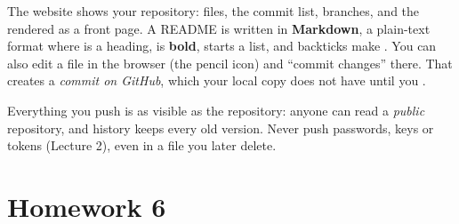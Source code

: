 The website shows your repository: files, the commit list, branches, and the  rendered as a front page. A README is written in \textbf{Markdown}, a plain-text format where  is a heading,  is \textbf{bold},  starts a list, and backticks make . You can also edit a file in the browser (the pencil icon) and ``commit changes'' there. That creates a \emph{commit on GitHub}, which your local copy does not have until you .

\begin{pitfall}
Everything you push is as visible as the repository: anyone can read a \emph{public} repository, and history keeps every old version. Never push passwords, keys or tokens (Lecture 2), even in a file you later delete.
\end{pitfall}

\section{Homework 6}

